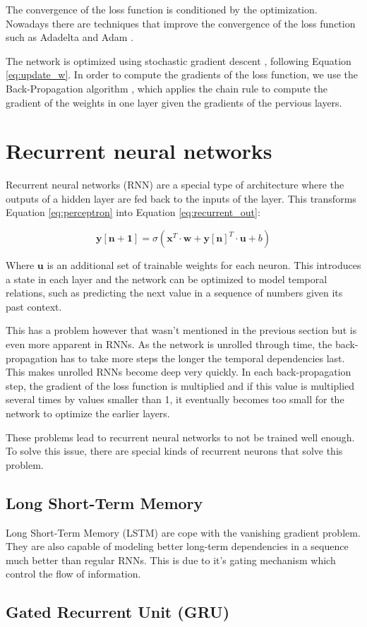The convergence of the loss function is conditioned by the optimization. Nowadays there are techniques that improve the convergence of the loss function such as Adadelta \cite{zeiler2012adadelta} and Adam \cite{kingma2014adam}. %

The network is optimized using stochastic gradient descent \cite{bottou2010large}, following Equation \ref{eq:update_w}. In order to compute the gradients of the loss function, we use the Back-Propagation algorithm \cite{chauvin1995backpropagation}, which applies the chain rule to compute the gradient of the weights in one layer given the gradients of the pervious layers.

\section{Recurrent neural networks}

Recurrent neural networks (RNN) are a special type of architecture where the outputs of a hidden layer are fed back to the inputs of the layer. This transforms Equation \ref{eq:perceptron} into Equation \ref{eq:recurrent_out}:

\begin{equation}
    \mathbf{y[n+1]} = \sigma(\mathbf{x}^T \cdot \mathbf{w} + \mathbf{y[n]}^T \cdot \mathbf{u} + b)
    \label{eq:recurrent_out}
\end{equation}

Where $\mathbf{u}$ is an additional set of trainable weights for each neuron. This introduces a state in each layer and the network can be optimized to model temporal relations, such as predicting the next value in a sequence of numbers given its past context.

This has a problem however that wasn't mentioned in the previous section but is even more apparent in RNNs. As the network is unrolled through time, the back-propagation has to take more steps the longer the temporal dependencies last. This makes unrolled RNNs become deep very quickly. In each back-propagation step, the gradient of the loss function is multiplied and if this value is multiplied several times by values smaller than 1, it eventually becomes too small for the network to optimize the earlier layers. 

These problems lead to recurrent neural networks to not be trained well enough. To solve this issue, there are special kinds of recurrent neurons that solve this problem.

\subsection{Long Short-Term Memory}

Long Short-Term Memory (LSTM) \cite{hochreiter1997long} are cope with the vanishing gradient problem. They are also capable of modeling better long-term dependencies in a sequence much better than regular RNNs. This is due to it's gating mechanism which control the flow of information.

\subsection{Gated Recurrent Unit (GRU)}
